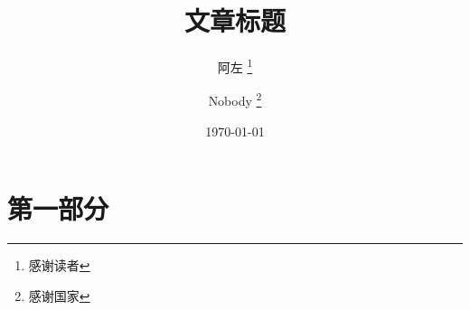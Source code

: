 \documentclass[10pt,a4paper]{book}
\title{文章标题}
\author{
	阿左 \thanks{感谢读者} \and 
	Nobody \thanks{感谢国家}
}
\date{\today}
\begin{document}
	\maketitle
	\tableofcontents

	\part{第一部分}

		
\end{document}
